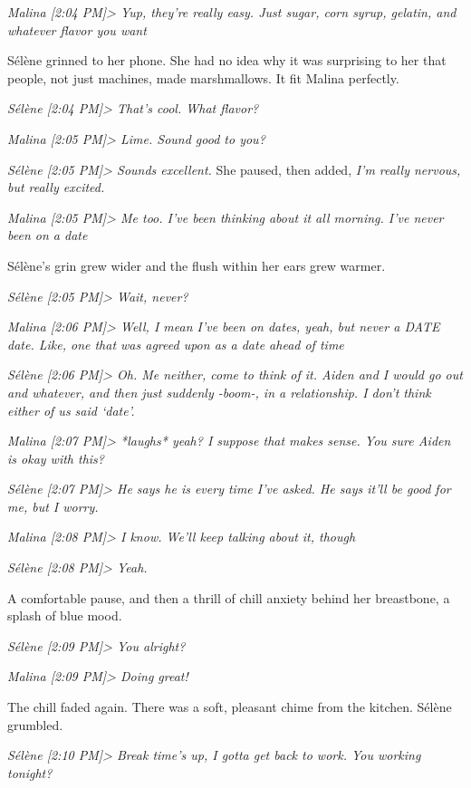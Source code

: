 \emph{Malina {[}2:04 PM{]}\textgreater{} Yup, they're really easy. Just sugar, corn syrup, gelatin, and whatever flavor you want}

Sélène grinned to her phone. She had no idea why it was surprising to her that people, not just machines, made marshmallows. It fit Malina perfectly.

\emph{Sélène {[}2:04 PM{]}\textgreater{} That's cool. What flavor?}

\emph{Malina {[}2:05 PM{]}\textgreater{} Lime. Sound good to you?}

\emph{Sélène {[}2:05 PM{]}\textgreater{} Sounds excellent.} She paused, then added, \emph{I'm really nervous, but really excited.}

\emph{Malina {[}2:05 PM{]}\textgreater{} Me too. I've been thinking about it all morning. I've never been on a date}

Sélène's grin grew wider and the flush within her ears grew warmer.

\emph{Sélène {[}2:05 PM{]}\textgreater{} Wait, never?}

\emph{Malina {[}2:06 PM{]}\textgreater{} Well, I mean I've been on dates, yeah, but never a DATE date. Like, one that was agreed upon as a date ahead of time}

\emph{Sélène {[}2:06 PM{]}\textgreater{} Oh. Me neither, come to think of it. Aiden and I would go out and whatever, and then just suddenly -boom-, in a relationship. I don't think either of us said `date'.}

\emph{Malina {[}2:07 PM{]}\textgreater{} *laughs* yeah? I suppose that makes sense. You sure Aiden is okay with this?}

\emph{Sélène {[}2:07 PM{]}\textgreater{} He says he is every time I've asked. He says it'll be good for me, but I worry.}

\emph{Malina {[}2:08 PM{]}\textgreater{} I know. We'll keep talking about it, though}

\emph{Sélène {[}2:08 PM{]}\textgreater{} Yeah.}

A comfortable pause, and then a thrill of chill anxiety behind her breastbone, a splash of blue mood.

\emph{Sélène {[}2:09 PM{]}\textgreater{} You alright?}

\emph{Malina {[}2:09 PM{]}\textgreater{} Doing great!}

The chill faded again. There was a soft, pleasant chime from the kitchen. Sélène grumbled.

\emph{Sélène {[}2:10 PM{]}\textgreater{} Break time's up, I gotta get back to work. You working tonight?}

